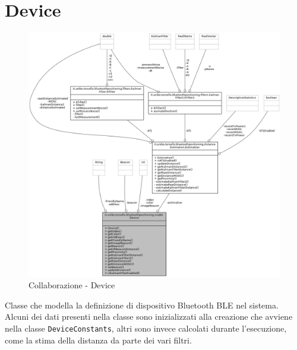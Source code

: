 \newpage
\section{Device}
\begin{figure}[ph]
	\centering
	\includegraphics[width=1.2\linewidth]{img/uml/class/classit_1_1unibo_1_1torsello_1_1bluetoothpositioning_1_1model_1_1Device__coll__graph.png}
	\caption{Collaborazione - Device}
\end{figure}

Classe che modella la definizione di dispositivo Bluetooth BLE nel sistema. Alcuni dei dati presenti nella classe sono inizializzati alla creazione che avviene nella classe \texttt{DeviceConstants}, altri sono invece calcolati durante l'esecuzione, come la stima della distanza da parte dei vari filtri.

\newpage
